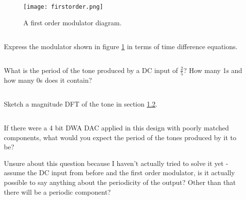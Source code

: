 \section{}

\begin{figure}
    \begin{center}
    \texttt{[image: firstorder.png]}
    \caption{A first order modulator diagram.}
    \label{fig:firstorder}
    \end{center}
\end{figure}

    \subsection{}
    Express the modulator shown in figure \ref{fig:firstorder} in terms of time difference equations.
    
    \subsection{}
    \label{B2:2}
    What is the period of the tone produced by a DC input of $\frac{2}{5}$?
    How many 1s and how many 0s does it contain?

    \subsection{}
    Sketch a magnitude DFT of the tone in section \ref{B2:2}.

    \subsection{}
    If there were a 4 bit DWA DAC applied in this design with poorly matched components, what would you expect the period of the tones produced by it to be? 
    
    Unsure about this question because I haven't actually tried to solve it yet - assume the DC input from before and the first order modulator, is it actually possible to say anything about the periodicity of the output? Other than that there will be a periodic component?

